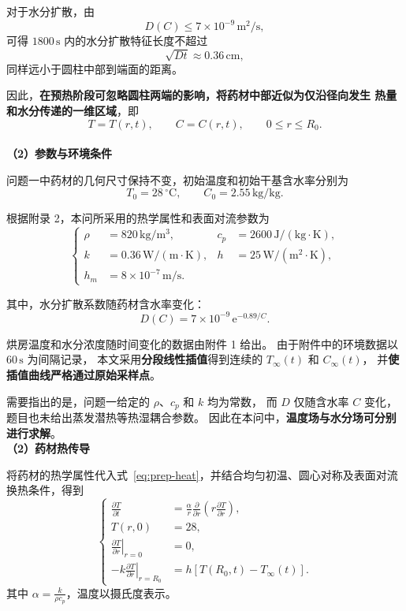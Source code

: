 对于水分扩散，由
\[
D(C)\leq7\times10^{-9}\,\mathrm{m^2/s},
\]
可得 $1800\,\mathrm{s}$ 内的水分扩散特征长度不超过
\[
\sqrt{Dt}\approx0.36\,\mathrm{cm},
\]
同样远小于圆柱中部到端面的距离。

因此，\textbf{在预热阶段可忽略圆柱两端的影响，将药材中部近似为仅沿径向发生
热量和水分传递的一维区域}，即
\[
T=T(r,t),\qquad C=C(r,t),\qquad 0\leq r\leq R_0.
\]
\\

\noindent\textbf{（2）参数与环境条件}

问题一中药材的几何尺寸保持不变，初始温度和初始干基含水率分别为
\[
T_0=28\,{}^\circ\mathrm{C},\qquad
C_0=2.55\,\mathrm{kg/kg}.
\]

根据附录 2，本问所采用的热学属性和表面对流参数为
\[
\left\{
\begin{aligned}
\rho&=820\,\mathrm{kg/m^3},
&c_p&=2600\,\mathrm{J/(kg\cdot K)},\\
k&=0.36\,\mathrm{W/(m\cdot K)},
&h&=25\,\mathrm{W/(m^2\cdot K)},\\
h_m&=8\times10^{-7}\,\mathrm{m/s}.
\end{aligned}
\right.
\]

其中，水分扩散系数随药材含水率变化：
\[
D(C)=7\times10^{-9}\,\mathrm{e}^{-0.89/C}.
\]

烘房温度和水分浓度随时间变化的数据由附件 1 给出。
由于附件中的环境数据以 $60\,\mathrm{s}$ 为间隔记录，
本文采用\textbf{分段线性插值}得到连续的
$T_\infty(t)$ 和 $C_\infty(t)$，
并\textbf{使插值曲线严格通过原始采样点}。

需要指出的是，问题一给定的 $\rho$、$c_p$ 和 $k$ 均为常数，
而 $D$ 仅随含水率 $C$ 变化，题目也未给出蒸发潜热等热湿耦合参数。
因此在本问中，\textbf{温度场与水分场可分别进行求解}。
\\

\noindent\textbf{（2）药材热传导}

将药材的热学属性代入式~\eqref{eq:prep-heat}，并结合均匀初温、圆心对称及表面对流换热条件，得到
\begin{equation}
\left\{
\begin{aligned}
\frac{\partial T}{\partial t}
&=\frac{\alpha}{r}\frac{\partial}{\partial r}
  \left(r\frac{\partial T}{\partial r}\right),\\
T(r,0)&=28,\\
\left.\frac{\partial T}{\partial r}\right|_{r=0}&=0,\\
-k\left.\frac{\partial T}{\partial r}\right|_{r=R_0}
&=h\left[T(R_0,t)-T_\infty(t)\right].
\end{aligned}
\right.
\label{eq:q1-heat-model}
\end{equation}
其中 $\alpha=\frac{k}{\rho c_p}$，温度以摄氏度表示。

